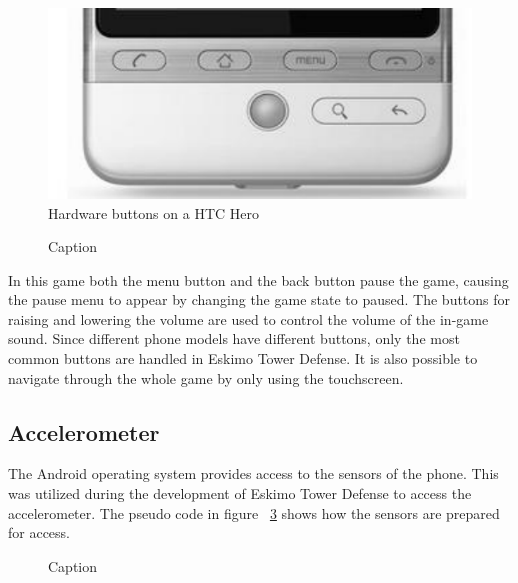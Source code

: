 \begin{figure} [here]
\begin{center}
\includegraphics[scale=0.6]{pics/chapters/chapter4/physicalbuttons}
\end{center}
\caption{Hardware buttons on a HTC Hero}
\label{fig:htcHeroButtons}
\end{figure}

\clearpage

\begin{figure}[here]
\begin{small}

\end{small}
\caption{Caption}
\label{fig:codeExOnKeyDown}
\end{figure}

In this game both the menu button and the back button pause the game, causing the pause menu to appear by changing the game state to paused. The buttons for raising and lowering the volume are used to control the volume of the in-game sound. Since different phone models have different buttons, only the most common buttons are handled in Eskimo Tower Defense. It is also possible to navigate through the whole game by only using the touchscreen.

\subsection{Accelerometer}

The Android operating system provides access to the sensors of the phone. This was utilized during the development of Eskimo Tower Defense to access the accelerometer. The pseudo code in figure ~\ref{fig:codeExAccelerometerCode} shows how the sensors are prepared for access.

\begin{figure}[htb]

\begin{small}

\end{small}

\caption{Caption}
\label{fig:codeExAccelerometerCode}

\end{figure}


